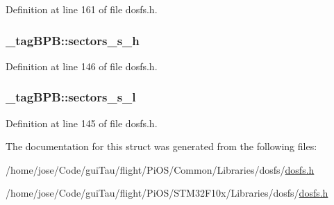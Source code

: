 Definition at line 161 of file dosfs.\-h.

\hypertarget{struct__tag_b_p_b_a802a986b05ee2c36a3ac5925b0342031}{
\subsubsection[{sectors\-\_\-s\-\_\-h}]{ \-\_\-tag\-B\-P\-B\-::sectors\-\_\-s\-\_\-h}}\label{struct__tag_b_p_b_a802a986b05ee2c36a3ac5925b0342031}


Definition at line 146 of file dosfs.\-h.

\hypertarget{struct__tag_b_p_b_aee93eff1b83b89f70c1c0ca5740b9b82}{
\subsubsection[{sectors\-\_\-s\-\_\-l}]{ \-\_\-tag\-B\-P\-B\-::sectors\-\_\-s\-\_\-l}}\label{struct__tag_b_p_b_aee93eff1b83b89f70c1c0ca5740b9b82}


Definition at line 145 of file dosfs.\-h.



The documentation for this struct was generated from the following files\-:\begin{DoxyCompactItemize}
\item 
/home/jose/\-Code/gui\-Tau/flight/\-Pi\-O\-S/\-Common/\-Libraries/dosfs/\hyperlink{_common_2_libraries_2dosfs_2dosfs_8h}{dosfs.\-h}\item 
/home/jose/\-Code/gui\-Tau/flight/\-Pi\-O\-S/\-S\-T\-M32\-F10x/\-Libraries/dosfs/\hyperlink{_s_t_m32_f10x_2_libraries_2dosfs_2dosfs_8h}{dosfs.\-h}\end{DoxyCompactItemize}
